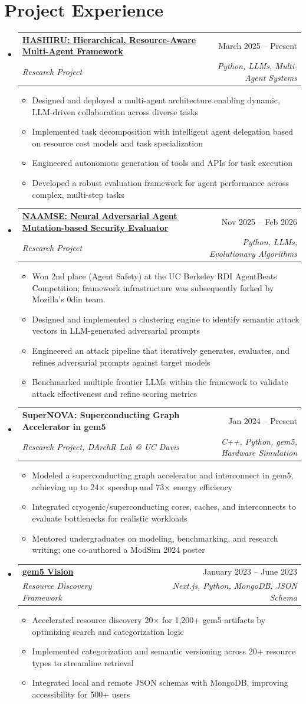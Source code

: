 \documentclass[letterpaper,10pt]{article}
\makeatletter
\newcommand{\resumeItem}[1]{\item\small{#1} \vspace{-3pt}}
\newcommand{\resumeSubheading}[4]{%
  \vspace{-1pt}\item
  \begin{tabular*}{0.97\textwidth}[t]{l@{\extracolsep{\fill}}r}
    \textbf{#1} & #2 \\
    \textit{#3} & \textit{#4} \\
  \end{tabular*}\vspace{-7pt}}
\newcommand{\resumeSubHeadingList}{\begin{itemize}[leftmargin=0.15in, label={}, labelsep=0.15in]}
\newcommand{\resumeJustifiedList}{\begin{itemize}[leftmargin=0.3in, label=\textbullet, labelsep=0.1in]}
\newcommand{\resumeSubHeadingListEnd}{\end{itemize}}
\makeatother
\begin{document}
\section{Project Experience}
{\normalsize
\resumeSubHeadingList
  \resumeSubheading{\href{https://github.com/HASHIRU-AI/HASHIRU}{HASHIRU: Hierarchical, Resource-Aware Multi-Agent Framework}}{March 2025 -- Present}{Research Project}{Python, LLMs, Multi-Agent Systems}
  \resumeJustifiedList
    \resumeItem{Designed and deployed a multi-agent architecture enabling dynamic, LLM-driven collaboration across diverse tasks}
    \resumeItem{Implemented task decomposition with intelligent agent delegation based on resource cost models and task specialization}
    \resumeItem{Engineered autonomous generation of tools and APIs for task execution}
    \resumeItem{Developed a robust evaluation framework for agent performance across complex, multi-step tasks}
  \end{itemize}
  \resumeSubheading{\href{https://hashiru-ai.github.io/naamse-website/}{NAAMSE: Neural Adversarial Agent Mutation-based Security Evaluator}}{Nov 2025 -- Feb 2026}{Research Project}{Python, LLMs, Evolutionary Algorithms}
  \resumeJustifiedList
    \resumeItem{Won 2nd place (Agent Safety) at the UC Berkeley RDI AgentBeats Competition; framework infrastructure was subsequently forked by Mozilla’s 0din team.}
    \resumeItem{Designed and implemented a clustering engine to identify semantic attack vectors in LLM-generated adversarial prompts}
    \resumeItem{Engineered an attack pipeline that iteratively generates, evaluates, and refines adversarial prompts against target models}
    \resumeItem{Benchmarked multiple frontier LLMs within the framework to validate attack effectiveness and refine scoring metrics}
  \end{itemize}
  \resumeSubheading{SuperNOVA: Superconducting Graph Accelerator in gem5}{Jan 2024 -- Present}{Research Project, DArchR Lab @ UC Davis}{C++, Python, gem5, Hardware Simulation}
  \resumeJustifiedList
    \resumeItem{Modeled a superconducting graph accelerator and interconnect in gem5, achieving up to 24$\times$ speedup and 73$\times$ energy efficiency}
    \resumeItem{Integrated cryogenic/superconducting cores, caches, and interconnects to evaluate bottlenecks for realistic workloads}
    \resumeItem{Mentored undergraduates on modeling, benchmarking, and research writing; one co-authored a ModSim 2024 poster}
  \end{itemize}
  \resumeSubheading{\href{https://resources.gem5.org/}{gem5 Vision}}{January 2023 -- June 2023}{Resource Discovery Framework}{Next.js, Python, MongoDB, JSON Schema}
  \resumeJustifiedList
    \resumeItem{Accelerated resource discovery 20$\times$ for 1,200+ gem5 artifacts by optimizing search and categorization logic}
    \resumeItem{Implemented categorization and semantic versioning across 20+ resource types to streamline retrieval}
    \resumeItem{Integrated local and remote JSON schemas with MongoDB, improving accessibility for 500+ users}
  \end{itemize}
\resumeSubHeadingListEnd
}
\end{document}
